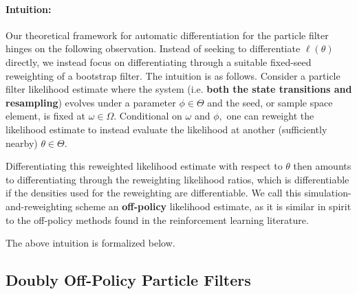 \documentclass{article}
\begin{document}
\paragraph{Intuition:} 
Our theoretical framework for automatic differentiation for the particle filter hinges on the following observation. Instead of seeking to differentiate $\ell(\theta)$ directly, we instead focus on differentiating through a suitable fixed-seed reweighting of a bootstrap filter. The intuition is as follows. Consider a particle filter likelihood estimate where the system (i.e. \textbf{both the state transitions and resampling}) evolves under a parameter $\phi \in \Theta$ and the seed, or sample space element, is fixed at $\omega \in \Omega.$ Conditional on $\omega$ and $\phi,$ one can reweight the likelihood estimate to instead evaluate the likelihood at another (sufficiently nearby) $\theta \in \Theta.$ 


Differentiating this reweighted likelihood estimate with respect to $\theta$ then amounts to differentiating through the reweighting likelihood ratios, which is differentiable if the densities used for the reweighting are differentiable. We call this simulation-and-reweighting scheme an \textbf{off-policy} likelihood estimate, as it is similar in spirit to the off-policy methods found in the reinforcement learning literature.

The above intuition is formalized below.


\subsection{Doubly Off-Policy Particle Filters}
\end{document}
